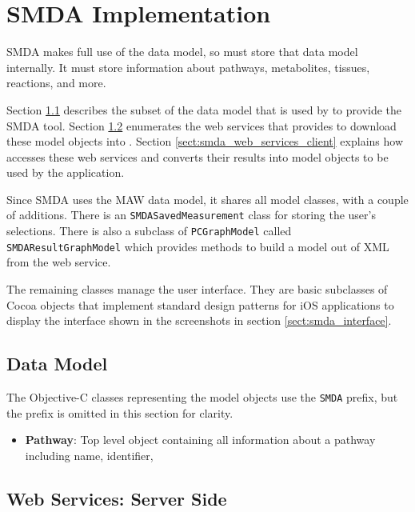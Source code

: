 \section{SMDA Implementation}
\label{sect:smda_implementation}

SMDA makes full use of the \pathcasemaw data model, so \mawapp must store that
data model internally. It must store information about pathways, metabolites,
tissues, reactions, and more.

Section \ref{sect:smda_data_model} describes the subset of the \pathcasemaw data
model that is used by \mawapp to provide the SMDA tool. Section
\ref{sect:smda_web_services_server} enumerates the web services that
\pathcasemaw provides to download these model objects into \mawapp. Section
\ref{sect:smda_web_services_client} explains how \mawapp accesses these web
services and converts their results into model objects to be used by the
application.

Since SMDA uses the MAW data model, it shares all model classes, with a couple
of additions. There is an \texttt{SMDASavedMeasurement} class for storing the
user's selections. There is also a subclass of \texttt{PCGraphModel} called
\texttt{SMDAResultGraphModel} which provides methods to build a model out of XML
from the web service.

The remaining classes manage the user interface. They are basic subclasses of
Cocoa objects that implement standard design patterns for iOS applications to
display the interface shown in the screenshots in section
\ref{sect:smda_interface}.

\subsection{Data Model}
\label{sect:smda_data_model}

The Objective-C classes representing the model objects use the \texttt{SMDA}
prefix, but the prefix is omitted in this section for clarity.

\begin{itemize}

    \item \textbf{Pathway}: Top level object containing all information about a
        pathway including name, identifier, 

\end{itemize}

\subsection{Web Services: Server Side}
\label{sect:smda_web_services_server}

